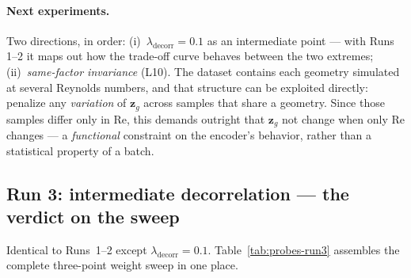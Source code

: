 \documentclass[11pt]{article}
\begin{document}
\paragraph{Next experiments.} Two directions, in order:
(i)~$\lambda_{\mathrm{decorr}} = 0.1$ as an intermediate point --- with
Runs 1--2 it maps out how the trade-off curve behaves between the two
extremes; (ii)~\emph{same-factor invariance} (L10). The dataset contains
each geometry simulated at several Reynolds numbers, and that structure
can be exploited directly: penalize any \emph{variation} of
$\boldsymbol{z}_{g}$ across samples that share a geometry. Since those
samples differ only in Re, this demands outright that
$\boldsymbol{z}_{g}$ not change when only Re changes --- a
\emph{functional} constraint on the encoder's behavior, rather than a
statistical property of a batch.

\subsection{Run 3: intermediate decorrelation --- the verdict on the sweep}

Identical to Runs~1--2 except $\lambda_{\mathrm{decorr}} = 0.1$.
Table~\ref{tab:probes-run3} assembles the complete three-point weight
sweep in one place.
\end{document}
